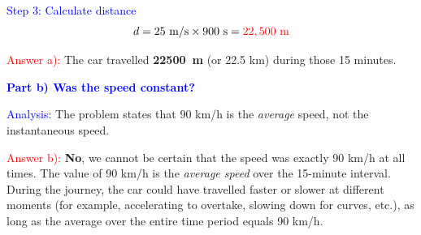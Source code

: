 \begin{exercise}
\begin{solu}
        \textcolor{blue}{Step 3: Calculate distance}
        \[
            d = 25 \text{ m/s} \times 900 \text{ s} = \textcolor{red}{22,500 \text{ m}}
        \]

        \textcolor{red}{Answer a):} The car travelled \textbf{\qty{22500}{\m}} (or 22.5 km) during those 15 minutes.

        \vspace{0.5cm}

        \textbf{\textcolor{blue}{Part b) Was the speed constant?}}

        \textcolor{blue}{Analysis:} The problem states that 90 km/h is the \textit{average} speed, not the instantaneous speed.

        \textcolor{red}{Answer b):} \textbf{No}, we cannot be certain that the speed was exactly 90 km/h at all times. The value of 90 km/h is the \textit{average speed} over the 15-minute interval. During the journey, the car could have travelled faster or slower at different moments (for example, accelerating to overtake, slowing down for curves, etc.), as long as the average over the entire time period equals 90 km/h.
    \end{solu}
\end{exercise}


